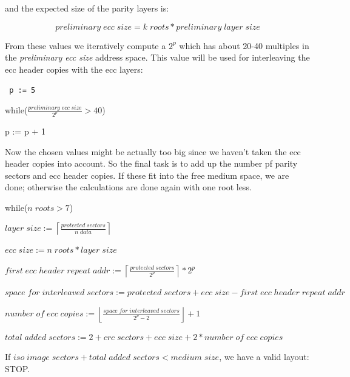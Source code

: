 and the expected size of the parity layers is:

\[preliminary\; ecc\; size = k\; roots * preliminary\; layer\; size\]

\smallskip

From these values we iteratively compute a $2^p$ which has about 20-40 multiples
in the {\em preliminary ecc size} address space. This value will be used
for interleaving the ecc header copies with the ecc layers:

\smallskip

{\tt
p := 5

while($\frac{preliminary\;ecc\;size}{2^p} > 40$)

\quad p := p + 1}  

\smallskip

Now the chosen values might be actually too big since we haven't taken
the ecc header copies into account. 
So the final task is to add up the number pf parity sectors and ecc header
copies. If these fit into the free medium space, we are done; otherwise
the calculations are done again with one root less.

\newpage

\bigskip

while($n\; roots > 7$)

\smallskip

\quad $layer\; size := \left\lceil\frac{protected\; sectors}{n\; data}\right\rceil$

\smallskip

\quad $ecc\; size := n\; roots * layer\; size$

\smallskip

\quad $first\; ecc\; header\; repeat\; addr := \left\lceil\frac{protected\; sectors}{2^p}\right\rceil * 2^p$ 

\smallskip

\quad $space\; for\; interleaved\; sectors := protected\; sectors + ecc\; size - first\; ecc\; header\; repeat\; addr$

\smallskip

\quad $number\; of\; ecc\; copies := \left\lfloor\frac{space\; for\; interleaved\; sectors}{2^p - 2}\right\rfloor + 1$

\smallskip

\quad $total\; added\; sectors := 2 + crc\; sectors + ecc\; size + 2 * number\; of\; ecc\; copies$

\medskip

\quad If $iso\; image\; sectors + total\; added\; sectors < medium\; size$,
we have a valid layout: STOP.

